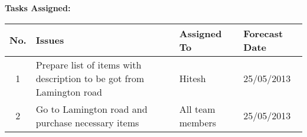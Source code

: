 \documentclass[a4paper,12pt]{article}
\begin{document}
\vskip20pt

\textbf{Tasks Assigned:}
\vskip10pt
\begin{tabular}{|c|p{6cm}|p{3cm}|p{4cm}|}
 \hline
 \hline
 \textbf{No.} & \textbf{Issues} & \textbf{Assigned To} & \textbf{Forecast Date} \\
  \hline
  \hline
1 & Prepare list of items with description to be got from Lamington road & Hitesh & 25/05/2013 \\
  \hline
2 & Go to Lamington road and purchase necessary items & All team members & 25/05/2013 \\
  \hline
\end{tabular}
\end{document}
